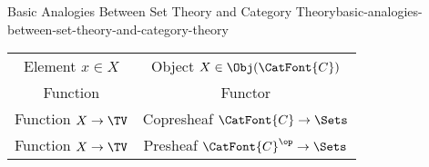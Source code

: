 \begin{remark}{Basic Analogies Between Set Theory and Category Theory}{basic-analogies-between-set-theory-and-category-theory}
\begin{center}
\begin{tabular}{|c|c|}
            Element $x\in X$                       & Object $X\in\Obj(\CatFont{C})$              \\\rowcolor{black!05!backgroundColor}
            Function                               & Functor                                     \\\rowcolor{backgroundColor}
            Function $X\to\TV$                     & Copresheaf $\CatFont{C}\to\Sets$              \\\rowcolor{black!05!backgroundColor}
            Function $X\to\TV$                     & Presheaf $\CatFont{C}^{\op}\to\Sets$        \\\hline
        \end{tabular}
    \end{center}
    \endgroup
\end{remark}
